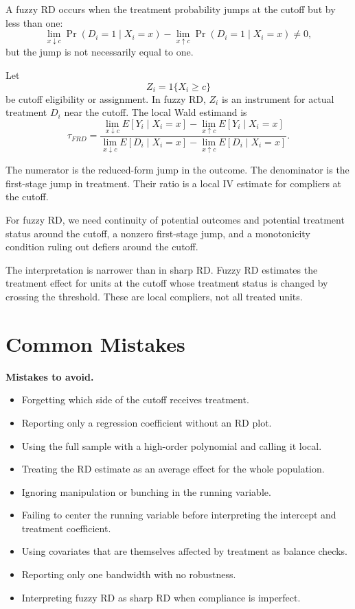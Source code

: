 \begin{defN}[Fuzzy RD]
A fuzzy RD occurs when the treatment probability jumps at the cutoff but by less than one:
\[
    \lim_{x \downarrow c}\Pr(D_i=1\mid X_i=x)
    -
    \lim_{x \uparrow c}\Pr(D_i=1\mid X_i=x)
    \neq 0,
\]
but the jump is not necessarily equal to one.
\end{defN}

Let
\[
    Z_i = 1\{X_i\geq c\}
\]
be cutoff eligibility or assignment. In fuzzy RD, $Z_i$ is an instrument for actual treatment $D_i$ near the cutoff. The local Wald estimand is
\[
    \tau_{FRD}
    =
    \frac{
    \lim_{x \downarrow c} E[Y_i\mid X_i=x]
    -
    \lim_{x \uparrow c} E[Y_i\mid X_i=x]
    }{
    \lim_{x \downarrow c} E[D_i\mid X_i=x]
    -
    \lim_{x \uparrow c} E[D_i\mid X_i=x]
    }.
\]

The numerator is the reduced-form jump in the outcome. The denominator is the first-stage jump in treatment. Their ratio is a local IV estimate for compliers at the cutoff.

\begin{assN}
For fuzzy RD, we need continuity of potential outcomes and potential treatment status around the cutoff, a nonzero first-stage jump, and a monotonicity condition ruling out defiers around the cutoff.
\end{assN}

The interpretation is narrower than in sharp RD. Fuzzy RD estimates the treatment effect for units at the cutoff whose treatment status is changed by crossing the threshold. These are local compliers, not all treated units.

\section{Common Mistakes}

\begin{boxF}
\textbf{Mistakes to avoid.}
\begin{itemize}
    \item Forgetting which side of the cutoff receives treatment.
    \item Reporting only a regression coefficient without an RD plot.
    \item Using the full sample with a high-order polynomial and calling it local.
    \item Treating the RD estimate as an average effect for the whole population.
    \item Ignoring manipulation or bunching in the running variable.
    \item Failing to center the running variable before interpreting the intercept and treatment coefficient.
    \item Using covariates that are themselves affected by treatment as balance checks.
    \item Reporting only one bandwidth with no robustness.
    \item Interpreting fuzzy RD as sharp RD when compliance is imperfect.
\end{itemize}
\end{boxF}

